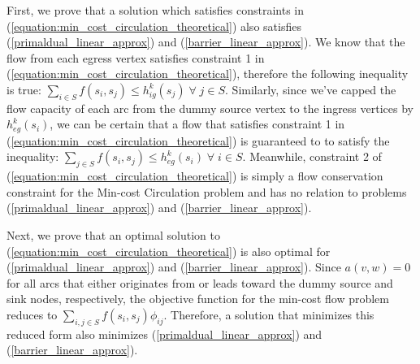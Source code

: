 \documentclass[sigconf]{acmart}
\theoremstyle{definition}
\begin{document}
\begin{appendices}
First, we prove that a solution which satisfies constraints in (\ref{equation:min_cost_circulation_theoretical}) also satisfies (\ref{primaldual_linear_approx}) and (\ref{barrier_linear_approx}). We know that the flow from each egress vertex satisfies constraint 1 in (\ref{equation:min_cost_circulation_theoretical}), therefore the following inequality is true: $\sum\limits_{i \in S} f(s_i, s_j) \leq h_{ig}^k(s_j) \; \forall \; j \in S$. Similarly, since we've capped the flow capacity of each arc from the dummy source vertex to the ingress vertices by $h_{eg}^k(s_i)$, we can be certain that a flow that satisfies constraint 1 in (\ref{equation:min_cost_circulation_theoretical}) is guaranteed to to satisfy the inequality: $\sum\limits_{j \in S} f(s_i, s_j) \leq h_{eg}^k(s_i) \; \forall \; i \in S$. Meanwhile, constraint 2 of (\ref{equation:min_cost_circulation_theoretical}) is simply a flow conservation constraint for the Min-cost Circulation problem and has no relation to problems (\ref{primaldual_linear_approx}) and (\ref{barrier_linear_approx}).

Next, we prove that an optimal solution to (\ref{equation:min_cost_circulation_theoretical}) is also optimal for (\ref{primaldual_linear_approx}) and (\ref{barrier_linear_approx}). Since $a(v,w) = 0$ for all arcs that either originates from or leads toward the dummy source and sink nodes, respectively, the objective function for the min-cost flow problem reduces to $\sum\limits_{i, j \in S} f(s_i, s_j)\phi_{ij}$. Therefore, a solution that minimizes this reduced form also minimizes (\ref{primaldual_linear_approx}) and (\ref{barrier_linear_approx}).




%


\end{appendices}
\end{document}
